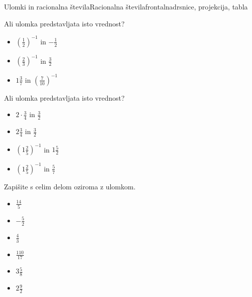 \begin{priprava}{1}{}{Ulomki in racionalna števila}{Racionalna števila}{frontalna}{drsnice, projekcija, tabla}
\begin{multicols}{2}
        
            \begin{naloga}
                Ali ulomka predstavljata isto vrednost?
                \begin{itemize}
                    \item $\left(\frac{1}{2}\right)^{-1}$ in $-\frac{1}{2}$ 
                    \item $\left(\frac{2}{3}\right)^{-1}$ in $\frac{3}{2}$ 
                    \item $ 1\frac{3}{7}$ in $\left(\frac{7}{10}\right)^{-1}$ 
               \end{itemize}
            \end{naloga}
        

        
            \begin{naloga}
                Ali ulomka predstavljata isto vrednost?
                \begin{itemize}
                    \item $ 2\cdot\frac{3}{4}$ in $\frac{3}{2}$ 
                    \item $ 2\frac{3}{4}$ in $\frac{3}{2}$ 
                    \item $\left(1\frac{2}{5}\right)^{-1}$ in $ 1\frac{5}{2}$ 
                    \item $\left(1\frac{2}{5}\right)^{-1}$ in $\frac{5}{7}$ 
               \end{itemize}
            \end{naloga}
        

        
            \begin{naloga}
                Zapišite s celim delom oziroma z ulomkom.
                \begin{itemize}
                            \item $\frac{14}{5}$ 
                            \item $-\frac{5}{2}$ 
                            \item $\frac{4}{3}$ 
                            \item $\frac{110}{17}$ 
                            \item $ 3\frac{5}{8}$ 
                            \item $ 2\frac{9}{2}$                  
               \end{itemize}
            \end{naloga}
            ~\\~~\\

        \end{multicols}
        


\end{priprava}